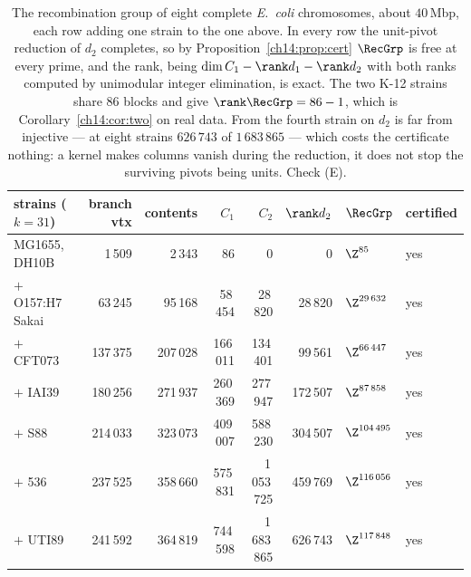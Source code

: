 \begin{table}[t]
\centering
\small
\begin{tabular}{lrrrrrll}
\toprule
strains ($k=31$) & branch vtx & contents & $C_1$ & $C_2$ & $\rank d_2$ & $\RecGrp$ & certified\\
\midrule
MG1655, DH10B & 1\,509 & 2\,343 & 86 & 0 & 0 & $\Z^{85}$ & yes\\
$+$ O157:H7 Sakai & 63\,245 & 95\,168 & 58\,454 & 28\,820 & 28\,820 & $\Z^{29\,632}$ & yes\\
$+$ CFT073 & 137\,375 & 207\,028 & 166\,011 & 134\,401 & 99\,561 & $\Z^{66\,447}$ & yes\\
$+$ IAI39 & 180\,256 & 271\,937 & 260\,369 & 277\,947 & 172\,507 & $\Z^{87\,858}$ & yes\\
$+$ S88 & 214\,033 & 323\,073 & 409\,007 & 588\,230 & 304\,507 & $\Z^{104\,495}$ & yes\\
$+$ 536 & 237\,525 & 358\,660 & 575\,831 & 1\,053\,725 & 459\,769 & $\Z^{116\,056}$ & yes\\
$+$ UTI89 & 241\,592 & 364\,819 & 744\,598 & 1\,683\,865 & 626\,743 & $\Z^{117\,848}$ & yes\\
\bottomrule
\end{tabular}
\caption{The recombination group of eight complete \emph{E.\ coli} chromosomes, about
$40$\,Mbp, each row adding one strain to the one above. In every row the unit-pivot reduction
of $d_2$ completes, so by Proposition~\ref{ch14:prop:cert} $\RecGrp$ is free at every prime, and the
rank, being $\dim C_1-\rank d_1-\rank d_2$ with both ranks computed by unimodular integer
elimination, is exact. The two K-12 strains share $86$ blocks and give $\rank\RecGrp=86-1$,
which is Corollary~\ref{ch14:cor:two} on real data. From the fourth strain on $d_2$ is far from
injective --- at eight strains $626\,743$ of $1\,683\,865$ --- which costs the certificate
nothing: a kernel makes columns vanish during the reduction, it does not stop the surviving
pivots being units. Check (E).}
\label{ch14:tab:real}
\end{table}

